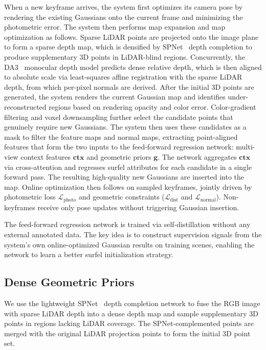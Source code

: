 \documentclass[letterpaper, 10pt, conference]{ieeeconf}
\begin{document}
When a new keyframe arrives, the system first optimizes its camera pose by rendering the existing Gaussians onto the current frame and minimizing the photometric error. The system then performs map expansion and map optimization as follows. Sparse LiDAR points are projected onto the image plane to form a sparse depth map, which is densified by SPNet~\cite{li2023spnet} depth completion to produce supplementary 3D points in LiDAR-blind regions. Concurrently, the DA3~\cite{lin2025da3} monocular depth model predicts dense relative depth, which is then aligned to absolute scale via least-squares affine registration with the sparse LiDAR depth, from which per-pixel normals are derived. After the initial 3D points are generated, the system renders the current Gaussian map and identifies under-reconstructed regions based on rendering opacity and color error. Color-gradient filtering and voxel downsampling further select the candidate points that genuinely require new Gaussians. The system then uses these candidates as a mask to filter the feature maps and normal maps, extracting point-aligned features that form the two inputs to the feed-forward regression network: multi-view context features $\mathbf{ctx}$ and geometric priors $\mathbf{g}$. The network aggregates $\mathbf{ctx}$ via cross-attention and regresses surfel attributes for each candidate in a single forward pass. The resulting high-quality new Gaussians are inserted into the map. Online optimization then follows on sampled keyframes, jointly driven by photometric loss $\mathcal{L}_{\text{photo}}$ and geometric constraints ($\mathcal{L}_{\text{dist}}$ and $\mathcal{L}_{\text{normal}}$). Non-keyframes receive only pose updates without triggering Gaussian insertion.

The feed-forward regression network is trained via self-distillation without any external annotated data. The key idea is to construct supervision signals from the system's own online-optimized Gaussian results on training scenes, enabling the network to learn a better surfel initialization strategy.

\subsection{Dense Geometric Priors}

We use the lightweight SPNet~\cite{li2023spnet} depth completion network to fuse the RGB image with sparse LiDAR depth into a dense depth map and sample supplementary 3D points in regions lacking LiDAR coverage. The SPNet-complemented points are merged with the original LiDAR projection points to form the initial 3D point set.
\end{document}
